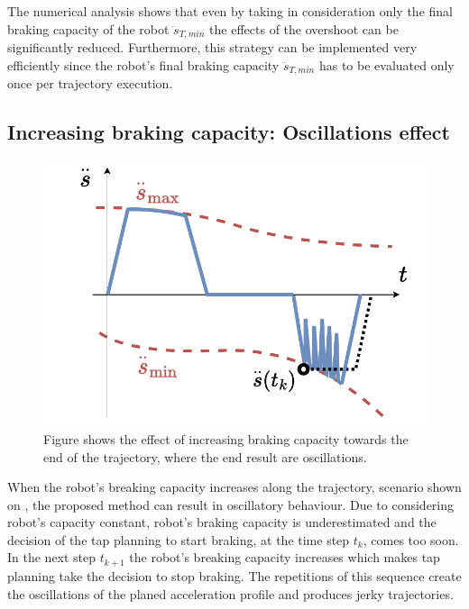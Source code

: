 The numerical analysis shows that even by taking in consideration only the final braking capacity of the robot $\ddot{s}_{T,min}$ the effects of the overshoot can be significantly reduced. Furthermore, this strategy can be implemented very efficiently since the robot's final braking capacity $\ddot{s}_{T,min}$ has to be evaluated only once per trajectory execution. 

\subsection{Increasing braking capacity: Oscillations effect}
\label{ch:oscillations}

\begin{figure}
    \centering
    \includegraphics[width=\linewidth]{Papers/imgs/oscil_how_it_looks.pdf}
    \caption{Figure shows the effect of increasing braking capacity towards the end of the trajectory, where the end result are oscillations. }
    \label{fig:oscil_expl}
\end{figure}
When the robot's breaking capacity increases along the trajectory, scenario shown on , the proposed method can result in oscillatory behaviour.  Due to considering robot's capacity constant, robot's braking capacity is underestimated and the decision of the \gls{tap} planning to start braking, at the time step $t_k$, comes too soon. In the next step $t_{k+1}$ the robot's breaking capacity increases which makes \gls{tap}  planning take the decision to stop braking. The repetitions of this sequence create the oscillations of the planed acceleration profile and produces jerky trajectories. 

